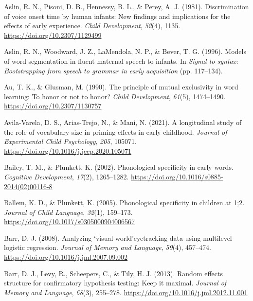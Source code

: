 \documentclass[
  12pt,
  b5paperpaper,
  twoside]{scrreprt}
\newlength{\cslhangindent}
\newlength{\cslentryspacingunit} %
\newenvironment{CSLReferences}[2] %
 {%
  \setlength{\parindent}{0pt}
  \ifodd #1
  \let\oldpar\par
  \def\par{\hangindent=\cslhangindent\oldpar}
  \fi
  \setlength{\parskip}{#2\cslentryspacingunit}
 }%
 {}
\begin{document}
\begin{CSLReferences}{1}{0}
\leavevmode{}%
Aslin, R. N., Pisoni, D. B., Hennessy, B. L., \& Perey, A. J. (1981).
Discrimination of voice onset time by human infants: New findings and
implications for the effects of early experience. \emph{Child
Development}, \emph{52}(4), 1135. \url{https://doi.org/10.2307/1129499}

\leavevmode{}%
Aslin, R. N., Woodward, J. Z., LaMendola, N. P., \& Bever, T. G. (1996).
Models of word segmentation in fluent maternal speech to infants. In
\emph{Signal to syntax: {Bootstrapping} from speech to grammar in early
acquisition} (pp. 117--134).

\leavevmode{}%
Au, T. K., \& Glusman, M. (1990). The principle of mutual exclusivity in
word learning: To honor or not to honor? \emph{Child Development},
\emph{61}(5), 1474--1490. \url{https://doi.org/10.2307/1130757}

\leavevmode{}%
Avila-Varela, D. S., Arias-Trejo, N., \& Mani, N. (2021). A longitudinal
study of the role of vocabulary size in priming effects in early
childhood. \emph{Journal of Experimental Child Psychology}, \emph{205},
105071. \url{https://doi.org/10.1016/j.jecp.2020.105071}

\leavevmode{}%
Bailey, T. M., \& Plunkett, K. (2002). Phonological specificity in early
words. \emph{Cognitive Development}, \emph{17}(2), 1265--1282.
\url{https://doi.org/10.1016/s0885-2014(02)00116-8}

\leavevmode{}%
Ballem, K. D., \& Plunkett, K. (2005). Phonological specificity in
children at 1;2. \emph{Journal of Child Language}, \emph{32}(1),
159--173. \url{https://doi.org/10.1017/s0305000904006567}

\leavevmode{}%
Barr, D. J. (2008). Analyzing `visual world'eyetracking data using
multilevel logistic regression. \emph{Journal of Memory and Language},
\emph{59}(4), 457--474. \url{https://doi.org/10.1016/j.jml.2007.09.002}

\leavevmode{}%
Barr, D. J., Levy, R., Scheepers, C., \& Tily, H. J. (2013). Random
effects structure for confirmatory hypothesis testing: Keep it maximal.
\emph{Journal of Memory and Language}, \emph{68}(3), 255--278.
\url{https://doi.org/10.1016/j.jml.2012.11.001}


\end{CSLReferences}
\end{document}
